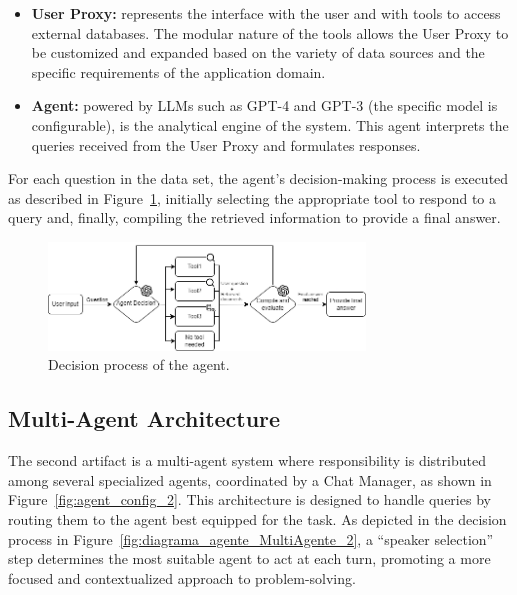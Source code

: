             \begin{itemize}        
                        
                \item \textbf{User Proxy:} represents the interface with the user and with tools to access external databases. The modular nature of the tools allows the User Proxy to be customized and expanded based on the variety of data sources and the specific requirements of the application domain.

                \item \textbf{Agent:} powered by LLMs such as GPT-4 and GPT-3 (the specific model is configurable), is the analytical engine of the system. This agent interprets the queries received from the User Proxy and formulates responses.
                                    
            \end{itemize}

            
            For each question in the data set, the agent's decision-making process is executed as described in Figure~\ref{fig:diagrama_agente_1}, initially selecting the appropriate tool to respond to a query and, finally, compiling the retrieved information to provide a final answer.

            \begin{figure}[h]
                \centering
                \includegraphics[width=0.75\textwidth]{images/agent_diagram_1.png}
                \caption{Decision process of the agent.}
                \label{fig:diagrama_agente_1}
            \end{figure}

        \subsection{Multi-Agent Architecture}

            The second artifact is a multi-agent system where responsibility is distributed among several specialized agents, coordinated by a Chat Manager, as shown in Figure~\ref{fig:agent_config_2}. This architecture is designed to handle queries by routing them to the agent best equipped for the task. As depicted in the decision process in Figure~\ref{fig:diagrama_agente_MultiAgente_2}, a \enquote{speaker selection} step determines the most suitable agent to act at each turn, promoting a more focused and contextualized approach to problem-solving.

